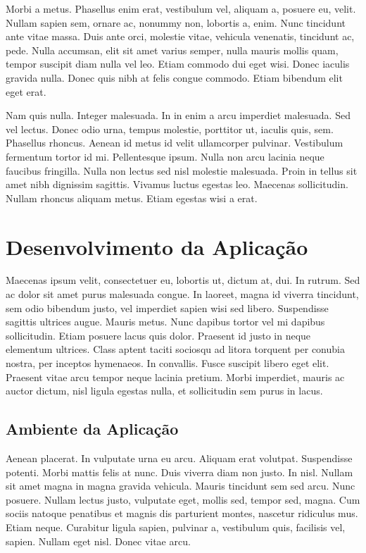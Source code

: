 Morbi a metus. Phasellus enim erat, vestibulum vel, aliquam a, posuere eu, velit. Nullam sapien sem, ornare ac, nonummy non, lobortis a, enim. Nunc tincidunt ante vitae massa. Duis ante orci, molestie vitae, vehicula venenatis, tincidunt ac, pede. Nulla accumsan, elit sit amet varius semper, nulla mauris mollis quam, tempor suscipit diam nulla vel leo. Etiam commodo dui eget wisi. Donec iaculis gravida nulla. Donec quis nibh at felis congue commodo. Etiam bibendum elit eget erat.

Nam quis nulla. Integer malesuada. In in enim a arcu imperdiet malesuada. Sed vel lectus. Donec odio urna, tempus molestie, porttitor ut, iaculis quis, sem. Phasellus rhoncus. Aenean id metus id velit ullamcorper pulvinar. Vestibulum fermentum tortor id mi. Pellentesque ipsum. Nulla non arcu lacinia neque faucibus fringilla. Nulla non lectus sed nisl molestie malesuada. Proin in tellus sit amet nibh dignissim sagittis. Vivamus luctus egestas leo. Maecenas sollicitudin. Nullam rhoncus aliquam metus. Etiam egestas wisi a erat.

\section{Desenvolvimento da Aplicação}

Maecenas ipsum velit, consectetuer eu, lobortis ut, dictum at, dui. In rutrum. Sed ac dolor sit amet purus malesuada congue. In laoreet, magna id viverra tincidunt, sem odio bibendum justo, vel imperdiet sapien wisi sed libero. Suspendisse sagittis ultrices augue. Mauris metus. Nunc dapibus tortor vel mi dapibus sollicitudin. Etiam posuere lacus quis dolor. Praesent id justo in neque elementum ultrices. Class aptent taciti sociosqu ad litora torquent per conubia nostra, per inceptos hymenaeos. In convallis. Fusce suscipit libero eget elit. Praesent vitae arcu tempor neque lacinia pretium. Morbi imperdiet, mauris ac auctor dictum, nisl ligula egestas nulla, et sollicitudin sem purus in lacus.


\subsection{Ambiente da Aplicação}

Aenean placerat. In vulputate urna eu arcu. Aliquam erat volutpat. Suspendisse potenti. Morbi mattis felis at nunc. Duis viverra diam non justo. In nisl. Nullam sit amet magna in magna gravida vehicula. Mauris tincidunt sem sed arcu. Nunc posuere. Nullam lectus justo, vulputate eget, mollis sed, tempor sed, magna. Cum sociis natoque penatibus et magnis dis parturient montes, nascetur ridiculus mus. Etiam neque. Curabitur ligula sapien, pulvinar a, vestibulum quis, facilisis vel, sapien. Nullam eget nisl. Donec vitae arcu.


